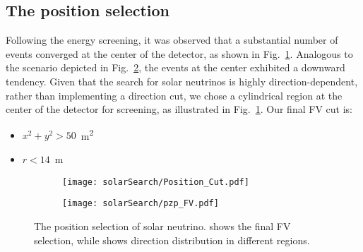 \subsection{The position selection}
Following the energy screening, it was observed that a substantial number of events converged at the center of the detector, as shown in Fig.~\ref{fig:solar_pos_cut}. Analogous to the scenario depicted in Fig.~\ref{fig:solar_direction}, the events at the center exhibited a downward tendency. Given that the search for solar neutrinos is highly direction-dependent, rather than implementing a direction cut, we chose a cylindrical region at the center of the detector for screening, as illustrated in Fig.~\ref{fig:solar_pos_cut}. Our final FV cut is:
\begin{itemize}
	\item $x^2+y^2>50$~\si{m^2}
	\item $r<14$~\si{m}
\end{itemize}

\begin{figure}[htbp]
	\centering
	\begin{subfigure}{0.5\textwidth}
		\centering
		\texttt{[image: solarSearch/Position\_Cut.pdf]}
		\label{fig:solar_pos_cut}
	\end{subfigure}%
	\begin{subfigure}{0.5\textwidth}
		\centering
		\texttt{[image: solarSearch/pzp\_FV.pdf]}
		\label{fig:solar_direction}
	\end{subfigure}
	\caption{The position selection of solar neutrino.  shows the final FV selection, while  shows direction distribution in different regions.}
	\label{fig:solar_position_cut}
\end{figure}
